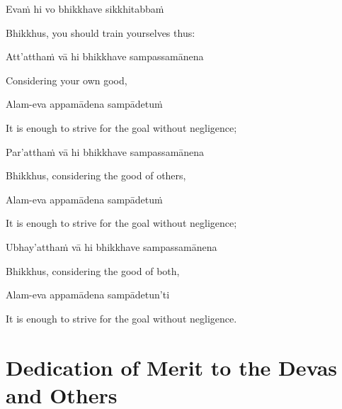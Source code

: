 Evaṁ hi vo bhikkhave sikkhitabbaṁ

\begin{english}
  Bhikkhus, you should train yourselves thus:
\end{english}

Att'atthaṁ vā hi bhikkhave sampassamānena

\begin{english}
  Considering your own good,
\end{english}

Alam-eva appamādena sampādetuṁ

\begin{english}
  It is enough to strive for the goal without negligence;
\end{english}

Par'atthaṁ vā hi bhikkhave sampassamānena

\begin{english}
  Bhikkhus, considering the good of others,
\end{english}

Alam-eva appamādena sampādetuṁ

\begin{english}
  It is enough to strive for the goal without negligence;
\end{english}

Ubhay'atthaṁ vā hi bhikkhave sampassamānena

\begin{english}
  Bhikkhus, considering the good of both,
\end{english}

Alam-eva appamādena sampādetun'ti

\begin{english}
  It is enough to strive for the goal without negligence.
\end{english}

\section{Dedication of Merit to the Devas and Others}



\begin{leader}
\end{leader}



